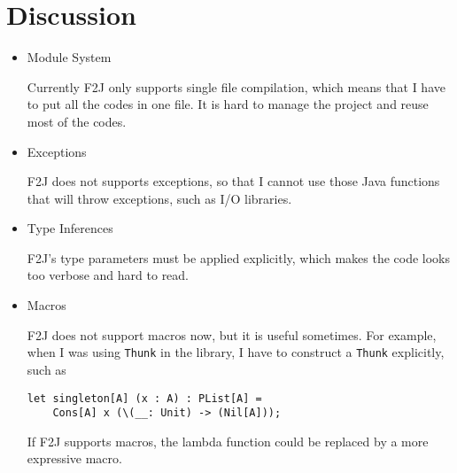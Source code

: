 \chapter{Discussion}

\begin{itemize}
\item Module System

Currently F2J only supports single file compilation, which means that I have to put all the codes in one file. It is hard to manage the project and reuse most of the codes.

\item Exceptions

F2J does not supports exceptions, so that I cannot use those Java functions that will throw exceptions, such as I/O libraries.

\item Type Inferences

F2J's type parameters must be applied explicitly, which makes the code looks too verbose and hard to read.

\item Macros

F2J does not support macros now, but it is useful sometimes. For example, when I was using \texttt{Thunk} in the library, I have to construct a \texttt{Thunk} explicitly, such as

\begin{lstlisting}
let singleton[A] (x : A) : PList[A] =
    Cons[A] x (\(__: Unit) -> (Nil[A]));
\end{lstlisting}

If F2J supports macros, the lambda function could be replaced by a more expressive macro.

\end{itemize}
